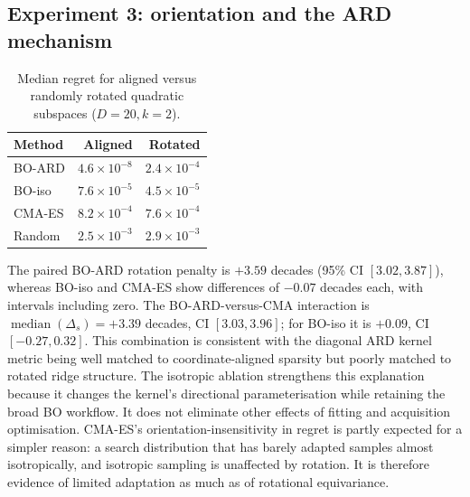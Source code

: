 \documentclass[11pt,a4paper]{article}
\newcommand{\med}{\operatorname{median}}
\begin{document}
\subsection{Experiment 3: orientation and the ARD mechanism}
\begin{table}[H]\centering\caption{Median regret for aligned versus randomly rotated quadratic subspaces ($D=20,k=2$).}\begin{tabular}{lrr}\toprule Method&Aligned&Rotated\\\midrule BO-ARD&$4.6\times10^{-8}$&$2.4\times10^{-4}$\\BO-iso&$7.6\times10^{-5}$&$4.5\times10^{-5}$\\CMA-ES&$8.2\times10^{-4}$&$7.6\times10^{-4}$\\Random&$2.5\times10^{-3}$&$2.9\times10^{-3}$\\\bottomrule\end{tabular}\end{table}
The paired BO-ARD rotation penalty is $+3.59$ decades (95\% CI $[3.02,3.87]$), whereas BO-iso and CMA-ES show differences of $-0.07$ decades each, with intervals including zero. The BO-ARD-versus-CMA interaction is $\med(\Delta_s)=+3.39$ decades, CI $[3.03,3.96]$; for BO-iso it is $+0.09$, CI $[-0.27,0.32]$. This combination is consistent with the diagonal ARD kernel metric being well matched to coordinate-aligned sparsity but poorly matched to rotated ridge structure. The isotropic ablation strengthens this explanation because it changes the kernel's directional parameterisation while retaining the broad BO workflow. It does not eliminate other effects of fitting and acquisition optimisation. CMA-ES's orientation-insensitivity in regret is partly expected for a simpler reason: a search distribution that has barely adapted samples almost isotropically, and isotropic sampling is unaffected by rotation. It is therefore evidence of limited adaptation as much as of rotational equivariance. %
\end{document}

